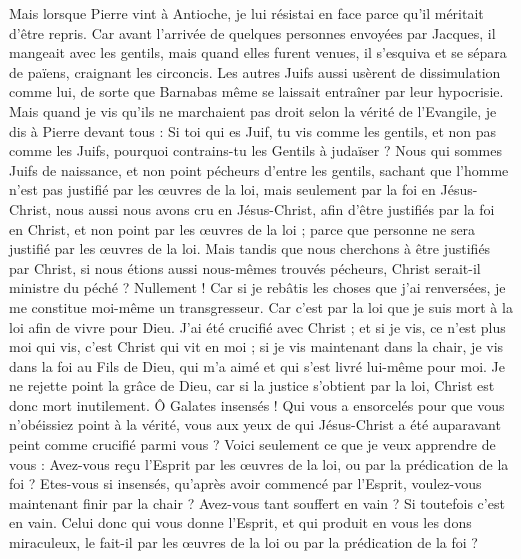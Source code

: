 \begin{multicols}{2}
Mais lorsque Pierre vint à Antioche, je lui résistai en face parce qu'il méritait d'être repris.
Car avant l’arrivée de quelques personnes envoyées par Jacques, il mangeait avec les gentils, mais quand elles furent venues, il s’esquiva et se sépara de païens, craignant les circoncis.
Les autres Juifs aussi usèrent de dissimulation comme lui, de sorte que Barnabas même se laissait entraîner par leur hypocrisie.
Mais quand je vis qu'ils ne marchaient pas droit selon la vérité de l'Evangile, je dis à Pierre devant tous : Si toi qui es Juif, tu vis comme les gentils, et non pas comme les Juifs, pourquoi contrains-tu les Gentils à judaïser ?
Nous qui sommes Juifs de naissance, et non point pécheurs d'entre les gentils,
sachant que l'homme n'est pas justifié par les œuvres de la loi, mais seulement par la foi en Jésus-Christ, nous aussi nous avons cru en Jésus-Christ, afin d’être justifiés par la foi en Christ, et non point par les œuvres de la loi ; parce que personne ne sera justifié par les œuvres de la loi.
Mais tandis que nous cherchons à être justifiés par Christ, si nous étions aussi nous-mêmes trouvés pécheurs, Christ serait-il ministre du péché ? Nullement !
Car si je rebâtis les choses que j'ai renversées, je me constitue moi-même un transgresseur.
Car c’est par la loi que je suis mort à la loi afin de vivre pour Dieu.
J’ai été crucifié avec Christ ; et si je vis, ce n’est plus moi qui vis, c’est Christ qui vit en moi ; si je vis maintenant dans la chair, je vis dans la foi au Fils de Dieu, qui m’a aimé et qui s’est livré lui-même pour moi.
Je ne rejette point la grâce de Dieu, car si la justice s’obtient par la loi, Christ est donc mort inutilement.
\VerseOne{}Ô Galates insensés ! Qui vous a ensorcelés pour que vous n'obéissiez point à la vérité, vous aux yeux de qui Jésus-Christ a été auparavant peint comme crucifié parmi vous ?
Voici seulement ce que je veux apprendre de vous : Avez-vous reçu l'Esprit par les œuvres de la loi, ou par la prédication de la foi ?
Etes-vous si insensés, qu’après avoir commencé par l'Esprit, voulez-vous maintenant finir par la chair ?
Avez-vous tant souffert en vain ? Si toutefois c'est en vain.
Celui donc qui vous donne l'Esprit, et qui produit en vous les dons miraculeux, le fait-il par les œuvres de la loi ou par la prédication de la foi ?

\end{multicols}
